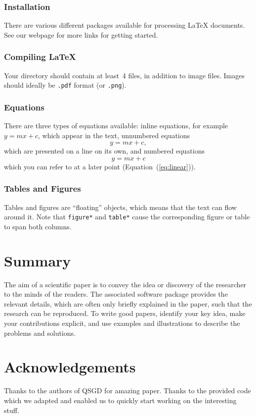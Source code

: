 \documentclass[10pt,conference,compsocconf]{IEEEtran}
\begin{document}
\subsubsection{Installation}

There are various different packages available for processing \LaTeX{}
documents. See our webpage for more links for getting started.

\subsubsection{Compiling \LaTeX{}}
Your directory should contain at least~4 files, in addition to image
files. Images should ideally be
\texttt{.pdf} format (or \texttt{.png}).

\subsubsection{Equations}

There are three types of equations available: inline equations, for
example $y=mx + c$, which appear in the text, unnumbered equations
$$y=mx + c,$$
which are presented on a line on its own, and numbered equations
\begin{equation}
  \label{eq:linear}
  y = mx + c
\end{equation}
which you can refer to at a later point (Equation~(\ref{eq:linear})).

\subsubsection{Tables and Figures}

Tables and figures are ``floating'' objects, which means that the text
can flow around it.
Note that \texttt{figure*} and \texttt{table*} cause the corresponding
figure or table to span both columns.



\section{Summary}

The aim of a scientific paper is to convey the idea or discovery of
the researcher to the minds of the readers. The associated software
package provides the relevant details, which are often only briefly
explained in the paper, such that the research can be reproduced.
To write good papers, identify your key idea, make your contributions
explicit, and use examples and illustrations to describe the problems
and solutions.

\section*{Acknowledgements}

Thanks to the authors of QSGD for amazing paper. Thanks to the provided code which we adapted and enabled us to quickly start working on the interesting stuff.


\newpage


\end{document}
